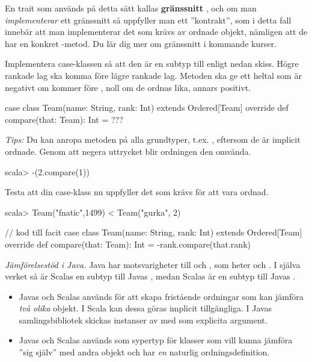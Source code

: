 \begin{Background}
En trait som används på detta sätt kallas \textbf{gränssnitt} , och om man \emph{implementerar} ett gränssnitt så uppfyller man ett ''kontrakt'', som i detta fall innebär att man implementerar det som krävs av ordnade objekt, nämligen att de har en konkret -metod. Du lär dig mer om gränssnitt i kommande kurser. 
\end{Background}

\Subtask Implementera case-klassen  så att den är en subtyp till  enligt nedan skiss. Högre rankade lag ska komma före lägre rankade lag. Metoden  ska ge ett heltal som är negativt om  kommer före , noll om de ordnas lika, annars positivt. 

\begin{Code}
case class Team(name: String, rank: Int) extends Ordered[Team]{
  override def compare(that: Team): Int = ???
} 
\end{Code}
\emph{Tips:} Du kan anropa metoden  på alla grundtyper, t.ex. , eftersom de är implicit ordnade. Genom att negera uttrycket blir ordningen den omvända.
\begin{REPL}
scala> -(2.compare(1))  
\end{REPL}

\Subtask Testa att  din case-klass nu uppfyller det som krävs för att vara ordnad. 
\begin{REPL}
scala> Team("fnatic",1499) < Team("gurka", 2) 
\end{REPL}

\begin{CodeSmall}
// kod till facit
case class  Team(name: String, rank: Int) extends Ordered[Team]{
  override def compare(that: Team): Int = -rank.compare(that.rank)
} 
\end{CodeSmall}

\Task \emph{Jämförelsestöd i Java.} 
Java har motsvarigheter till  och , som heter  och . I själva verket så är Scalas  en subtyp till Javas , medan Scalas  är en subtyp till Javas . 
\begin{itemize}[nolistsep, noitemsep]
\item Javas  och Scalas  används för att skapa fristående ordningar som kan jämföra \emph{två olika} objekt. I Scala kan dessa göras implicit tillgängliga. I Javas samlingsbibliotek skickas instanser av  med som explicita argument.
\item Javas  och Scalas  används som sypertyp för klasser som vill kunna jämföra ''sig själv'' med andra objekt och har \emph{en} naturlig ordningsdefinition.
\end{itemize}

